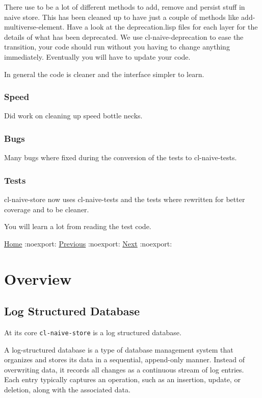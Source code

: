 \documentclass[11pt]{article}
\begin{document}
There use to be a lot of different methods to add, remove and persist
stuff in naive store. This has been cleaned up to have just a couple
of methods like add-multiverse-element. Have a look at the
deprecation.lisp files for each layer for the details of what has been
deprecated. We use cl-naive-deprecation to ease the transition, your
code should run without you having to change anything
immediately. Eventually you will have to update your code.

In general the code is cleaner and the interface simpler to learn.

\subsubsection{Speed}
\label{sec:orge74f081}

Did work on cleaning up speed bottle necks.

\subsubsection{Bugs}
\label{sec:org7606eb9}

Many bugs where fixed during the conversion of the tests to cl-naive-tests.

\subsubsection{Tests}
\label{sec:orgb26f6f9}

cl-naive-store now uses cl-naive-tests and the tests where rewritten
for better coverage and to be cleaner.

You will learn a lot from reading the test code.

\href{home.org}{Home} :noexport: \href{home.org}{Previous} :noexport: \href{overview.org}{Next} :noexport:
\section{Overview}
\label{sec:orgd5c7db8}

\subsection{Log Structured Database}
\label{sec:org21e24d5}

At its core \texttt{cl-naive-store} is a log structured database.

A log-structured database is a type of database management system that
organizes and stores its data in a sequential, append-only
manner. Instead of overwriting data, it records all changes
as a continuous stream of log entries. Each entry typically captures
an operation, such as an insertion, update, or deletion, along with
the associated data.
\end{document}
